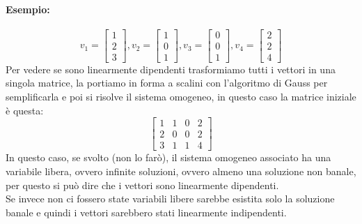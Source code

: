 \documentclass[12pt,a4paper]{article}
\begin{document}
\paragraph{Esempio:}
\[
v_1 = \begin{bmatrix}
  1\\
  2\\
  3
\end{bmatrix}, v_2 = \begin{bmatrix}
  1\\
  0\\
  1
\end{bmatrix}, v_3 = \begin{bmatrix}
  0\\
  0\\
  1
\end{bmatrix}, v_4 = \begin{bmatrix}
  2\\
  2\\
  4
\end{bmatrix}
\]
Per vedere se sono linearmente dipendenti trasformiamo tutti i vettori in una singola matrice, la portiamo in forma a scalini con l'algoritmo di Gauss per semplificarla e poi si risolve il sistema omogeneo, in questo caso la matrice iniziale è questa:
\[
\begin{bmatrix}
  1 & 1 & 0 & 2\\
  2 & 0 & 0 & 2\\
  3 & 1 & 1 & 4
\end{bmatrix}
\]
In questo caso, se svolto (non lo farò), il sistema omogeneo associato ha una variabile libera, ovvero infinite soluzioni, ovvero almeno una soluzione non banale, per questo si può dire che i vettori sono linearmente dipendenti.\\
Se invece non ci fossero state variabili libere sarebbe esistita solo la soluzione banale e quindi i vettori sarebbero stati linearmente indipendenti.
\end{document}

